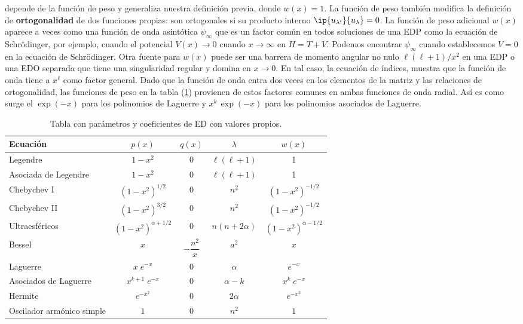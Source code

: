 depende de la función de peso y generaliza nuestra definición previa, donde $w(x) = 1$. La función de peso también modifica la definición de \textbf{ortogonalidad} de dos funciones propias: son ortogonales si su producto interno $\ip{u_{\lambda^{\prime}}}{u_{\lambda}}= 0$. La función de peso adicional $w(x)$ aparece a veces como una función de onda asintótica $\psi_{\infty}$ que es un factor común en todos soluciones de una EDP como la ecuación de Schrödinger, por ejemplo, cuando el potencial $V(x) \to 0$ cuando $x \to \infty$ en $H = T + V$. Podemos encontrar $\psi_{\infty}$ cuando establecemos $V=0$ en la ecuación de Schrödinger. Otra fuente para $w(x)$ puede ser una barrera de momento angular no nulo $\ell (\ell +1)/x^{2}$ en una EDP o una EDO separada que tiene una singularidad regular y domina en $x \to 0$. En tal caso, la ecuación de índices, muestra que la función de onda tiene a $x^{\ell}$ como factor general. Dado que la función de onda entra dos veces en los elementos de la matriz y las relaciones de ortogonalidad, las funciones de peso en la tabla (\ref{tabla:tabla_01}) provienen de estos factores comunes en ambas funciones de onda radial. Así es como surge el $\exp(-x)$ para los polinomios de Laguerre y $x^{k} \, \exp(-x)$ para los polinomios asociados de Laguerre.
\begin{table}[H]
\centering
\begin{tabular}{p{6cm} c c c c }
\hline
Ecuación & $p(x)$ & $q(x)$ & $\lambda$ & $w(x)$ \\ \hline
Legendre & $1 - x^{2}$ & 0 & $\ell (\ell + 1)$ & 1  \\
Asociada de Legendre & $1 - x^{2}$ & 0 & $\ell (\ell + 1)$ & 1  \\
Chebychev I & $(1 - x^{2})^{1/2}$ & $0$ & $n^{2}$ & $(1 - x^{2})^{-1/2}$ \\
Chebychev II & $(1 - x^{2})^{3/2}$ & $0$ & $n^{2}$ & $(1 - x^{2})^{-1/2}$ \\
Ultraesféricos & $(1-x^{2})^{\alpha + 1/2}$ & 0 & $n(n + 2 \alpha)$ & $(1-x^{2})^{\alpha -1/2}$ \\
Bessel & $x$ & $- \dfrac{n^{2}}{x}$ & $a^{2}$ & $x$ \\
Laguerre & $x \; e^{-x}$ & $0$ & $\alpha$ & $e^{-x}$ \\
Asociados de Laguerre & $x^{k+1} \; e^{-x}$ & $0$  & $\alpha - k$ & $x^{k} \; e^{-x}$ \\
Hermite & $e^{-x^{2}}$ & $0$ & $2 \alpha$ & $e^{-x^{2}}$ \\
Oscilador armónico simple & $1$ & $0$ & $n^{2}$ & $1$
\end{tabular}
\caption{Tabla con parámetros y coeficientes de ED con valores propios.}
\label{tabla:tabla_01}
\end{table}
